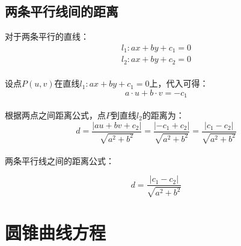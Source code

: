 \documentclass[UTF8]{ctexart}
\begin{document}
\subsection{两条平行线间的距离}
    对于两条平行的直线：
    \begin{align*}
        l_{1}:ax+by+c_{1}=0\\
        l_{2}:ax+by+c_{2}=0
    \end{align*}\\
    设点$P(u,v)$在直线$l_{1}:ax+by+c_{1}=0$上，代入可得：
    \begin{equation*}
        a \cdot u+b \cdot v=-c_{1}
    \end{equation*}\\
    根据两点之间距离公式，点$P$到直线$l_{2}$的距离为：\\
    \begin{equation*}
        d=\frac{\left|au+bv+c_{2}\right|}{\sqrt{a^2+b^2}}
        =\frac{\left|-c_{1}+c_{2}\right|}{\sqrt{a^2+b^2}}
        =\frac{\left|c_{1}-c_{2}\right|}{\sqrt{a^2+b^2}}
    \end{equation*}\\[4mm]
    两条平行线之间的距离公式：
    \begin{large}
        \begin{equation*}
            d=\frac{\left|c_{1}-c_{2}\right|}{\sqrt{a^2+b^2}}
        \end{equation*}
    \end{large}

\newpage

\section{圆锥曲线方程}
\end{document}
